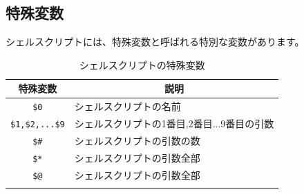 \documentclass[a4j]{ltjsreport}
\begin{document}



    \subsection{特殊変数}
    シェルスクリプトには、特殊変数と呼ばれる特別な変数があります。
    \begin{longtable}[c]{|c|l|}
        \hline
        \multicolumn{1}{|c|}{\textbf{特殊変数}}&\multicolumn{1}{|c|}{\textbf{説明}}\\
        \hline\hline
        \texttt{\$0} & シェルスクリプトの名前 \\
        \hline
        \texttt{\$1,\$2,...\$9} & シェルスクリプトの1番目,2番目...9番目の引数 \\
        \hline
        \texttt{\$\#} & シェルスクリプトの引数の数 \\
        \hline
        \texttt{\$*} & シェルスクリプトの引数全部 \\
        \hline
        \texttt{\$@} & シェルスクリプトの引数全部 \\
        \hline
        \caption{シェルスクリプトの特殊変数}
    \end{longtable}
\end{document}
